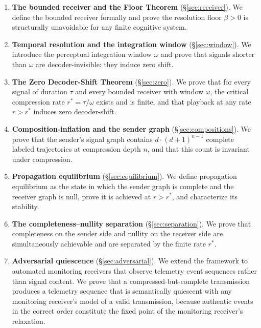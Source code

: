 \documentclass[twocolumn,11pt,a4paper]{article}
\theoremstyle{main}
\theoremstyle{definition}
\theoremstyle{remark}
\newcommand{\floor}{\beta}
\newcommand{\rate}{r}
\newcommand{\window}{\omega}
\begin{document}
\begin{enumerate}[leftmargin=1.4em,itemsep=2pt]
\item \textbf{The bounded receiver and the Floor Theorem}
  (\S\ref{sec:receiver}). We define the bounded receiver formally and
  prove the resolution floor $\floor > 0$ is structurally unavoidable
  for any finite cognitive system.
\item \textbf{Temporal resolution and the integration window}
  (\S\ref{sec:window}). We introduce the perceptual integration window
  $\window$ and prove that signals shorter than $\window$ are
  decoder-invisible: they induce zero shift.
\item \textbf{The Zero Decoder-Shift Theorem}
  (\S\ref{sec:zero}). We prove that for every signal of duration $\tau$
  and every bounded receiver with window $\window$, the critical
  compression rate $\rate^* = \tau / \window$ exists and is finite, and
  that playback at any rate $\rate > \rate^*$ induces zero decoder-shift.
\item \textbf{Composition-inflation and the sender graph}
  (\S\ref{sec:compositions}). We prove that the sender's signal graph
  contains $d \cdot (d+1)^{n-1}$ complete labeled trajectories at
  compression depth $n$, and that this count is invariant under
  compression.
\item \textbf{Propagation equilibrium}
  (\S\ref{sec:equilibrium}). We define propagation equilibrium as the
  state in which the sender graph is complete and the receiver graph is
  null, prove it is achieved at $\rate > \rate^*$, and characterize its
  stability.
\item \textbf{The completeness--nullity separation}
  (\S\ref{sec:separation}). We prove that completeness on the sender
  side and nullity on the receiver side are simultaneously achievable
  and are separated by the finite rate $\rate^*$.
\item \textbf{Adversarial quiescence}
  (\S\ref{sec:adversarial}). We extend the framework to automated
  monitoring receivers that observe telemetry event sequences rather
  than signal content. We prove that a compressed-but-complete
  transmission produces a telemetry sequence that is semantically
  quiescent with any monitoring receiver's model of a valid
  transmission, because authentic events in the correct order
  constitute the fixed point of the monitoring receiver's relaxation.
\end{enumerate}

\end{document}
